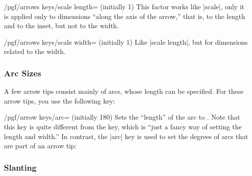 \begin{key}{/pgf/arrows keys/scale length= (initially 1)}
  This factor works like |scale|, only it is applied only to
  dimensions ``along the axis of the arrow,'' that is, to the length
  and to the inset, but not to the width. 
\begin{codeexample}[]
\end{codeexample}  
\end{key}

\begin{key}{/pgf/arrows keys/scale width= (initially 1)}
  Like |scale length|, but for dimensions related to the width.
\begin{codeexample}[]
\end{codeexample}  
\end{key}


\subsubsection{Arc Sizes}

A few arrow tips consist mainly of arcs, whose length can be
specified. For these arrow tips, you use the following key:

\begin{key}{/pgf/arrow keys/arc= (initially 180)}
  Sets the ``length'' of the arc to . Note that this key
  is quite different from the  key, which is ``just a
  fancy way of setting the length and width.'' In contrast, the |arc|
  key is used to set the degrees of arcs that are part of an arrow
  tip:
\begin{codeexample}[]
\end{codeexample}  
\end{key}


\subsubsection{Slanting}

